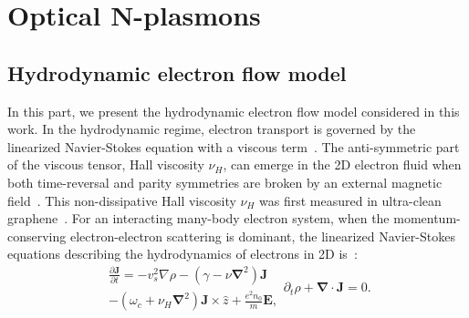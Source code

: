 \documentclass[%
reprint,
amsmath,amssymb,
aps,superscriptaddress
]{revtex4-2}
\begin{document}
\section{Optical N-plasmons}\label{section2}

\subsection{Hydrodynamic electron flow model}

In this part, we present the hydrodynamic electron flow model considered in this work.
In the hydrodynamic regime, electron transport is governed by the linearized Navier-Stokes equation with a viscous term~\cite{torre2015nonlocal,fetter1985edge,li2022hydrodynamic,levitov2016electron}. The anti-symmetric part of the viscous tensor, Hall viscosity $\nu_H$, can emerge in the 2D electron fluid when both time-reversal and parity symmetries are broken by an external magnetic field~\cite{avron1995viscosity,bradlyn2012kubo,avron1998odd,read2009non,gusev2018viscous,burmistrov2019dissipative,afanasiev2022hall,alekseev2016negative,sherafati2016hall,rao2023resolving,holder2019unified,narozhny2019magnetohydrodynamics,varnavides2020electron}. This non-dissipative Hall viscosity $\nu_H$ was first measured in ultra-clean graphene~\cite{berdyugin2019measuring}. For an interacting many-body electron system, when the momentum-conserving electron-electron scattering is dominant, the linearized Navier-Stokes equations describing the hydrodynamics of electrons in 2D is~\cite{van2021optical,fetter1985edge,torre2015nonlocal}:
\begin{subequations}\label{equation1}
\begin{multline}\label{equation1a}
   \frac{\partial \mathbf{J}}{\partial t}=-v_s^2\nabla \rho - (\gamma-\nu \mathbf{\nabla}^2) \mathbf{J}\\ 
   - (\omega_c+\nu_H \mathbf{\nabla}^2) \mathbf{J} \times \hat{z} +\frac{e^2n_0}{m}\mathbf{E},
\end{multline}
\begin{equation}\label{equation1b}
    \partial_t\rho+\pmb{\nabla}\cdot\mathbf{J}=0.
\end{equation}
\end{subequations}
\end{document}
